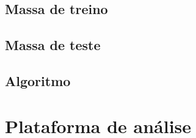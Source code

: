 \subsection{Massa de treino}

\subsection{Massa de teste}

\subsection{Algoritmo}


\section{Plataforma de análise}
